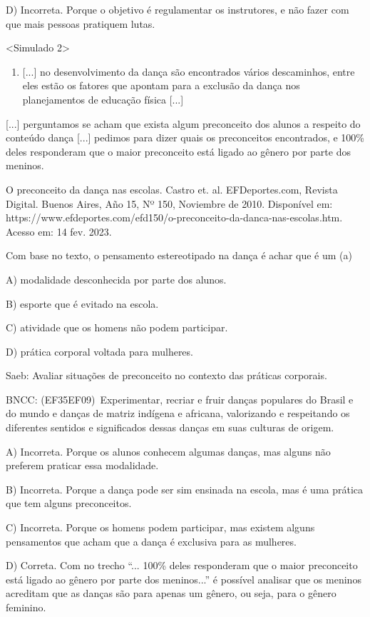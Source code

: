 D) Incorreta. Porque o objetivo é regulamentar os instrutores, e não
fazer com que mais pessoas pratiquem lutas.

\textless{}Simulado 2\textgreater{}

\begin{enumerate}
\def\labelenumi{\arabic{enumi}.}
\item
  {[}...{]} no desenvolvimento da dança são encontrados vários
  descaminhos, entre eles estão os fatores que apontam para a exclusão
  da dança nos planejamentos de educação física {[}...{]}
\end{enumerate}

{[}...{]} perguntamos se acham que exista algum preconceito dos alunos a
respeito do conteúdo dança {[}...{]} pedimos para dizer quais os
preconceitos encontrados, e 100\% deles responderam que o maior
preconceito está ligado ao gênero por parte dos meninos.

O preconceito da dança nas escolas. Castro et. al. EFDeportes.com,
Revista Digital. Buenos Aires, Año 15, Nº 150, Noviembre de 2010.
Disponível em:
https://www.efdeportes.com/efd150/o-preconceito-da-danca-nas-escolas.htm.
Acesso em: 14 fev. 2023.

Com base no texto, o pensamento estereotipado na dança é achar que é um
(a)

A) modalidade desconhecida por parte dos alunos.

B) esporte que é evitado na escola.

C) atividade que os homens não podem participar.

D) prática corporal voltada para mulheres.

Saeb: Avaliar situações de preconceito no contexto das práticas
corporais.

BNCC: (EF35EF09)~Experimentar, recriar e fruir danças populares do
Brasil e do mundo e danças de matriz indígena e africana, valorizando e
respeitando os diferentes sentidos e significados dessas danças em suas
culturas de origem.

A) Incorreta. Porque os alunos conhecem algumas danças, mas alguns não
preferem praticar essa modalidade.

B) Incorreta. Porque a dança pode ser sim ensinada na escola, mas é uma
prática que tem alguns preconceitos.

C) Incorreta. Porque os homens podem participar, mas existem alguns
pensamentos que acham que a dança é exclusiva para as mulheres.

D) Correta. Com no trecho ``... 100\% deles responderam que o maior
preconceito está ligado ao gênero por parte dos meninos...'' é possível
analisar que os meninos acreditam que as danças são para apenas um
gênero, ou seja, para o gênero feminino.

